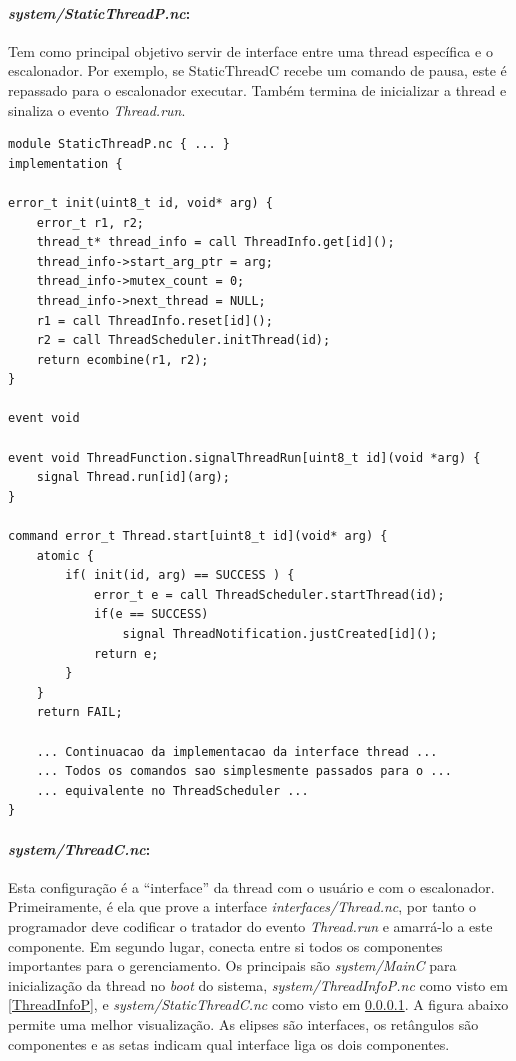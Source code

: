 \paragraph{\textit{system/StaticThreadP.nc}:}\label{StaticThreadC}
Tem como principal objetivo servir de interface entre uma thread específica e o escalonador. Por exemplo, se
StaticThreadC recebe um comando de pausa, este é repassado para o escalonador executar. Também termina de inicializar a
thread e sinaliza o evento \textit{Thread.run}.
\begin{lstlisting}
module StaticThreadP.nc { ... }
implementation {

error_t init(uint8_t id, void* arg) {                                   
    error_t r1, r2;                                                       
    thread_t* thread_info = call ThreadInfo.get[id]();                    
    thread_info->start_arg_ptr = arg;                                     
    thread_info->mutex_count = 0;                                         
    thread_info->next_thread = NULL;                                      
    r1 = call ThreadInfo.reset[id]();                                     
    r2 = call ThreadScheduler.initThread(id);                             
    return ecombine(r1, r2);                                              
}  

event void 

event void ThreadFunction.signalThreadRun[uint8_t id](void *arg) {
    signal Thread.run[id](arg);
}

command error_t Thread.start[uint8_t id](void* arg) {
    atomic {
        if( init(id, arg) == SUCCESS ) {
            error_t e = call ThreadScheduler.startThread(id);
            if(e == SUCCESS)
                signal ThreadNotification.justCreated[id]();
            return e;
        }
    }
    return FAIL;

    ... Continuacao da implementacao da interface thread ...
    ... Todos os comandos sao simplesmente passados para o ...
    ... equivalente no ThreadScheduler ...
}

\end{lstlisting}

\paragraph{\textit{system/ThreadC.nc}:}
Esta configuração é a ``interface'' da thread com o usuário e com o escalonador. Primeiramente, é ela que prove a 
interface \textit{interfaces/Thread.nc}, por tanto o programador deve codificar o tratador do evento 
\textit{Thread.run} e amarrá-lo a este componente. Em segundo lugar, conecta entre si todos os componentes 
importantes para o gerenciamento. Os principais são \textit{system/MainC} para inicialização da thread no \textit{boot} do sistema,
 \textit{system/ThreadInfoP.nc} como visto em \ref{ThreadInfoP}, e \textit{system/StaticThreadC.nc} como visto em
\ref{StaticThreadC}. A figura abaixo permite uma melhor visualização. As elipses são interfaces, os retângulos são
componentes e as setas indicam qual interface liga os dois componentes.

